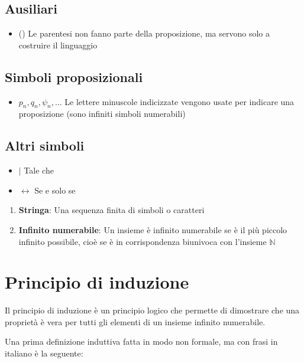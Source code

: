 \documentclass{article}
\theoremstyle{break}
\theoremstyle{break}
\theoremstyle{break}
\theoremstyle{break}
\begin{document}
\subsection{Ausiliari}
\begin{itemize}
	\item () Le parentesi non fanno parte della proposizione,
	      ma servono solo a costruire il linguaggio
\end{itemize}

\subsection{Simboli proposizionali}
\begin{itemize}
	\item \( p_n, q_n, \psi_n, \ldots  \) Le lettere minuscole indicizzate vengono usate per indicare
	      una proposizione (sono infiniti simboli numerabili)
\end{itemize}

\subsection{Altri simboli}
\begin{itemize}
	\item \( | \) Tale che
	\item \( \leftrightarrow \) Se e solo se
\end{itemize}

\begin{define}
	\begin{enumerate}
		\item \textbf{Stringa}: Una sequenza finita di simboli o caratteri
		\item \textbf{Infinito numerabile}: Un insieme è infinito numerabile se è il
		      più piccolo infinito possibile, cioè se è in corrispondenza
		      biunivoca con l'insieme \( \mathbb{N} \)
	\end{enumerate}
\end{define}

\section{Principio di induzione}
Il principio di induzione è un principio logico che permette di dimostrare che una proprietà è vera
per tutti gli elementi di un insieme infinito numerabile.

Una prima definizione induttiva fatta in modo non formale, ma con frasi in italiano è la seguente:
\end{document}
